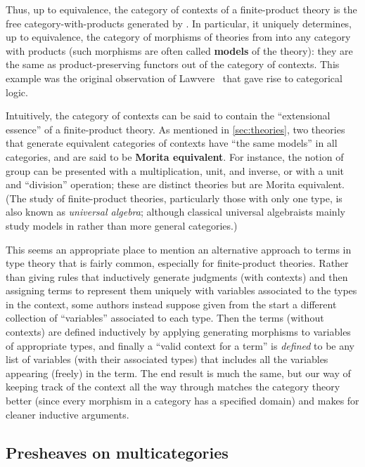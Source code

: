 Thus, up to equivalence, the category of contexts of a finite-product theory \cP is the free category-with-products generated by \cP.
In particular, it uniquely determines, up to equivalence, the category of morphisms of theories from \cP into any category with products (such morphisms are often called \textbf{models} of the theory): they are the same as product-preserving functors out of the category of contexts.
This example was the original observation of Lawvere~\cite{lawvere:functsem} that gave rise to categorical logic.

Intuitively, the category of contexts can be said to contain the ``extensional essence'' of a finite-product theory.
As mentioned in \cref{sec:theories}, two theories that generate equivalent categories of contexts have ``the same models'' in all categories, and are said to be \textbf{Morita equivalent}.
For instance, the notion of group can be presented with a multiplication, unit, and inverse, or with a unit and ``division'' operation; these are distinct theories but are Morita equivalent.
(The study of finite-product theories, particularly those with only one type, is also known as \emph{universal algebra}; although classical universal algebraists mainly study models in \bSet rather than more general categories.)

\begin{rmk}
  This seems an appropriate place to mention an alternative approach to terms in type theory that is fairly common, especially for finite-product theories.
  Rather than giving rules that inductively generate judgments (with contexts) and then assigning terms to represent them uniquely with variables associated to the types in the context, some authors instead suppose given from the start a different collection of ``variables'' associated to each type.
  Then the terms (without contexts) are defined inductively by applying generating morphisms to variables of appropriate types, and finally a ``valid context for a term'' is \emph{defined} to be any list of variables (with their associated types) that includes all the variables appearing (freely) in the term.
  The end result is much the same, but our way of keeping track of the context all the way through matches the category theory better (since every morphism in a category has a specified domain) and makes for cleaner inductive arguments.
\end{rmk}


\subsection{Presheaves on multicategories}
\label{sec:multicat-pshf}

